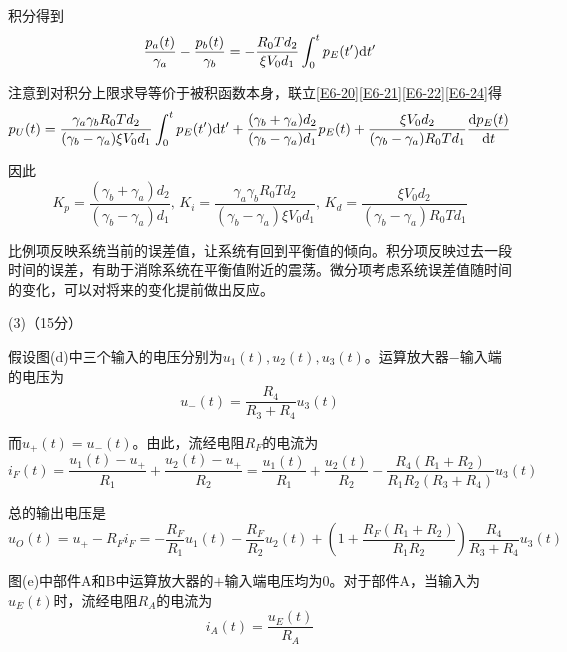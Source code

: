 \documentclass[10pt,a4paper,onecolumn,UTF8]{ctexart}
\begin{document}
	积分得到
	\begin{equation}\label{E6-24}
		\frac{p_a(t)}{\gamma_a} -\frac{p_b(t)}{\gamma_b}=-\frac{R_0T d_2}{\xi V_0 d_1}\int_0^t p_E(t')\mathrm{d} t'
	\end{equation}
	
	注意到对积分上限求导等价于被积函数本身，联立\eqref{E6-20}\eqref{E6-21}\eqref{E6-22}\eqref{E6-24}得
	\begin{equation}\label{E6-25}
		p_U(t)=\frac{\gamma_a\gamma_bR_0Td_2}{(\gamma_b-\gamma_a)\xi V_0d_1}\int_0^t p_E(t')\mathrm{d} t'+\frac{(\gamma_b+\gamma_a)d_2}{(\gamma_b-\gamma_a)d_1}p_E(t)+\frac{\xi V_0d_2}{(\gamma_b-\gamma_a)R_0Td_1}\frac{\mathrm{d} p_E(t)}{\mathrm{d} t}
	\end{equation}
	
	因此
	\begin{equation}
		K_p=\frac{(\gamma_b+\gamma_a)d_2}{(\gamma_b-\gamma_a)d_1},\,K_i=\frac{\gamma_a\gamma_bR_0Td_2}{(\gamma_b-\gamma_a)\xi V_0d_1},\,K_d=\frac{\xi V_0d_2}{(\gamma_b-\gamma_a)R_0Td_1}
	\end{equation}
	
	比例项反映系统当前的误差值，让系统有回到平衡值的倾向。积分项反映过去一段时间的误差，有助于消除系统在平衡值附近的震荡。微分项考虑系统误差值随时间的变化，可以对将来的变化提前做出反应。
	
	(3)（15分）
	
	假设图(d)中三个输入的电压分别为$u_1(t),u_2(t),u_3(t)$。运算放大器$-$输入端的电压为
	\begin{equation}
		u_-(t)=\frac{R_4}{R_3+R_4}u_3(t)
	\end{equation}
	
	而$u_+(t)=u_-(t)$。由此，流经电阻$R_F$的电流为
	\begin{equation}
		i_F(t)=\frac{u_1(t)-u_+}{R_1}+\frac{u_2(t)-u_+}{R_2}=\frac{u_1(t)}{R_1}+\frac{u_2(t)}{R_2}-\frac{R_4(R_1+R_2)}{R_1R_2(R_3+R_4)}u_3(t)
	\end{equation}
	
	总的输出电压是
	\begin{equation}\label{E6-29}
		u_O(t)=u_+-R_Fi_F=-\frac{R_F}{R_1}u_1(t)-\frac{R_F}{R_2}u_2(t)+\left(1+\frac{R_F(R_1+R_2)}{R_1R_2}\right)\frac{R_4}{R_3+R_4}u_3(t)
	\end{equation}
	
	图(e)中部件A和B中运算放大器的$+$输入端电压均为0。对于部件A，当输入为$u_E(t)$时，流经电阻$R_A$的电流为
	\begin{equation}
		i_A(t)=\frac{u_E(t)}{R_A}
	\end{equation}
	
\end{document}
